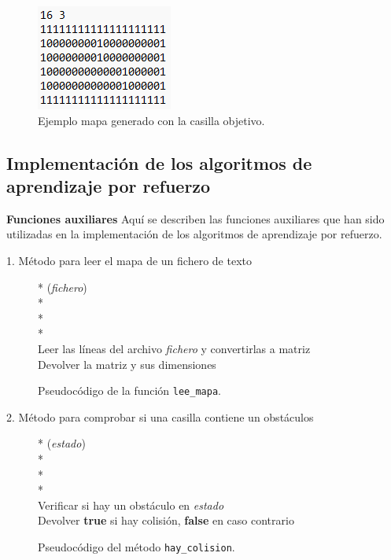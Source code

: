 \documentclass[conference,a4paper]{IEEEtran}
\begin{document}
\begin{figure}[h]
  \centering
  \includegraphics{Ejemplo_mapa.png}
  \caption{Ejemplo mapa generado con la casilla objetivo.}
  \label{fig:Ejemplo_mapa}
\end{figure}

\subsection{Implementación de los algoritmos de aprendizaje por refuerzo}

\textbf{Funciones auxiliares\newline}
Aquí se describen las funciones auxiliares que han sido utilizadas en la implementación de los algoritmos de aprendizaje por refuerzo.\newline

1. Método para leer el mapa de un fichero de texto


\begin{figure}[h]
  \begin{pseudo}*
    (\textit{fichero}) \\*
     \\*
     \\*
    \\
    Leer las líneas del archivo \textit{fichero} y convertirlas a matriz \\
    Devolver la matriz y sus dimensiones
  \end{pseudo}
  \caption{Pseudocódigo de la función \texttt{lee\_mapa}.}
  \label{fig:lee_mapa}
\end{figure}

2. Método para comprobar si una casilla contiene un obstáculos\newline

\begin{figure}[h]
  \begin{pseudo}*
    (\textit{estado}) \\*
     \\*
     \\*
     \\
    Verificar si hay un obstáculo en \textit{estado} \\
    Devolver \textbf{true} si hay colisión, \textbf{false} en caso contrario
  \end{pseudo}
  \caption{Pseudocódigo del método \texttt{hay\_colision}.}
  \label{fig:hay_colision}
\end{figure}
\end{document}
